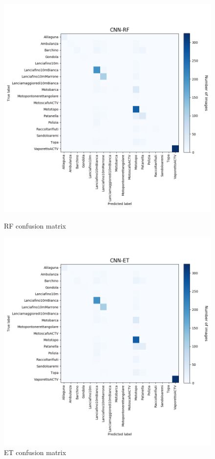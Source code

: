 \documentclass[12pt]{article}
\begin{document}
\begin{figure}[!ht]
	\centering
	\begin{minipage}{.5\textwidth}
		\centering
		\includegraphics[width=.9\linewidth]{../code/output/CNN-RF.png}
		\caption{RF confusion matrix} 
		\label{fig:cnf_rf}
	\end{minipage}%
	\begin{minipage}{.5\textwidth}
		\centering
		\includegraphics[width=.9\linewidth]{../code/output/CNN-ET.png}
		\caption{ET confusion matrix} 
		\label{fig:cnf_et}
	\end{minipage}
\end{figure}
\end{document}
